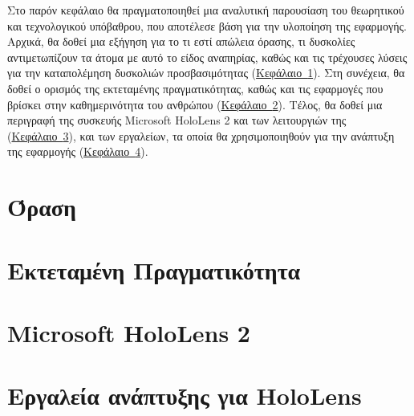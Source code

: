 
Στο παρόν κεφάλαιο θα πραγματοποιηθεί μια αναλυτική παρουσίαση του θεωρητικού και τεχνολογικού υπόβαθρου, που αποτέλεσε βάση για την υλοποίηση της εφαρμογής. Αρχικά, θα δοθεί μια εξήγηση για το τι εστί απώλεια όρασης, τι δυσκολίες αντιμετωπίζουν τα άτομα με αυτό το είδος αναπηρίας, καθώς και τις τρέχουσες λύσεις για την καταπολέμηση δυσκολιών προσβασιμότητας (\hyperref[sec:visualImpairment]{Κεφάλαιο~\ref*{sec:visualImpairment}}). Στη συνέχεια, θα δοθεί ο ορισμός της εκτεταμένης πραγματικότητας, καθώς και τις εφαρμογές που βρίσκει στην καθημερινότητα του ανθρώπου (\hyperref[sec:extendedReality]{Κεφάλαιο~\ref*{sec:extendedReality}}). Τέλος, θα δοθεί μια περιγραφή της συσκευής Microsoft HoloLens 2 και των λειτουργιών της (\hyperref[sec:hololensDesc]{Κεφάλαιο~\ref*{sec:hololensDesc}}), και των εργαλείων, τα οποία θα χρησιμοποιηθούν για την ανάπτυξη της εφαρμογής (\hyperref[sec:hololensTools]{Κεφάλαιο~\ref*{sec:hololensTools}}).

\section{Όραση}\label{sec:visualImpairment}



\section{Εκτεταμένη Πραγματικότητα}\label{sec:extendedReality}



\section{Microsoft HoloLens 2}\label{sec:hololensDesc}




\section{Εργαλεία ανάπτυξης για HoloLens}\label{sec:hololensTools}


